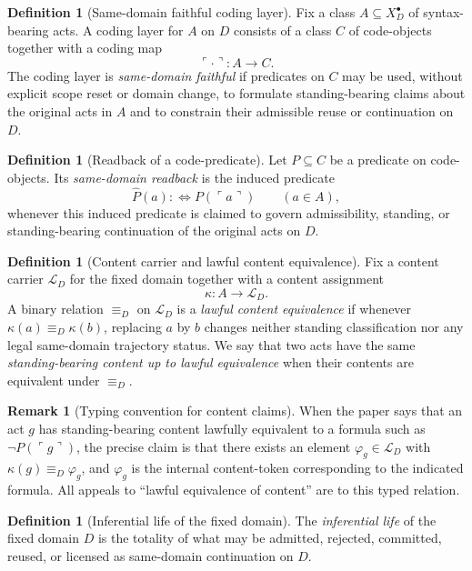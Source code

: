 \documentclass[11pt]{article}
\theoremstyle{plain}
\theoremstyle{definition}
\newtheorem{definition}[theorem]{Definition}
\newtheorem{remark}[theorem]{Remark}
\newcommand{\code}[1]{\ulcorner #1 \urcorner}
\newcommand{\Eval}{X_D^{\bullet}}
\newcommand{\domain}{D}
\begin{document}
\begin{definition}[Same-domain faithful coding layer]
Fix a class $A \subseteq \Eval$ of syntax-bearing acts. A coding layer for $A$ on $\domain$ consists of a class $C$ of code-objects together with a coding map
\[
\code{\cdot}:A\to C.
\]
The coding layer is \emph{same-domain faithful} if predicates on $C$ may be used, without explicit scope reset or domain change, to formulate standing-bearing claims about the original acts in $A$ and to constrain their admissible reuse or continuation on $\domain$.
\end{definition}

\begin{definition}[Readback of a code-predicate]
Let $P\subseteq C$ be a predicate on code-objects. Its \emph{same-domain readback} is the induced predicate
\[
\widehat P(a):\Longleftrightarrow P(\code{a})
\qquad (a\in A),
\]
whenever this induced predicate is claimed to govern admissibility, standing, or standing-bearing continuation of the original acts on $\domain$.
\end{definition}

\begin{definition}[Content carrier and lawful content equivalence]
Fix a content carrier $\mathcal{L}_{\domain}$ for the fixed domain together with a content assignment
\[
\kappa:A\to \mathcal{L}_{\domain}.
\]
A binary relation $\equiv_{\domain}$ on $\mathcal{L}_{\domain}$ is a \emph{lawful content equivalence} if whenever $\kappa(a)\equiv_{\domain}\kappa(b)$, replacing $a$ by $b$ changes neither standing classification nor any legal same-domain trajectory status. We say that two acts have the same \emph{standing-bearing content up to lawful equivalence} when their contents are equivalent under $\equiv_{\domain}$.
\end{definition}

\begin{remark}[Typing convention for content claims]
When the paper says that an act $g$ has standing-bearing content lawfully equivalent to a formula such as $\neg P(\code{g})$, the precise claim is that there exists an element $\varphi_g\in \mathcal{L}_{\domain}$ with $\kappa(g)\equiv_{\domain}\varphi_g$, and $\varphi_g$ is the internal content-token corresponding to the indicated formula. All appeals to ``lawful equivalence of content'' are to this typed relation.
\end{remark}

\begin{definition}[Inferential life of the fixed domain]
The \emph{inferential life} of the fixed domain $\domain$ is the totality of what may be admitted, rejected, committed, reused, or licensed as same-domain continuation on $\domain$.
\end{definition}
\end{document}
